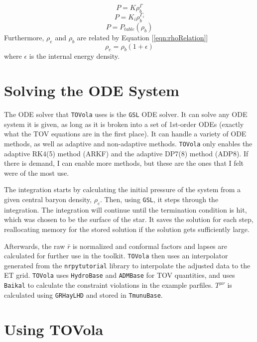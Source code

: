\begin{equation}\label{eqn:EOS:S}
P=K\rho_b^{\Gamma}
\end{equation}
\begin{equation}\label{eqn:EOS:P}
P=K_i\rho_b^{\Gamma_i}
\end{equation}
\begin{equation}\label{eqn:EOS:T}
P=P_{table}(\rho_b)
\end{equation}
Furthermore, $\rho_e$ and $\rho_b$ are related by Equation [\ref{eqn:rhoRelation}]
\begin{equation}\label{eqn:rhoRelation}
\rho_e = \rho_b(1+\epsilon)
\end{equation}
where $\epsilon$ is the internal energy density.

\section{Solving the ODE System}

The ODE solver that {\tt TOVola} uses is the {\tt GSL} ODE solver. It can solve any ODE system it is given, as long as it is broken into a set of 1st-order ODEs (exactly what the TOV equations are in the first place). It can handle a variety of ODE methods, as well as adaptive and non-adaptive methods. {\tt TOVola} only enables the adaptive RK4(5) method (ARKF) and the adaptive DP7(8) method (ADP8). If there is demand, I can enable more methods, but these are the ones that I felt were of the most use.

The integration starts by calculating the initial pressure of the system from a given central baryon density, $\rho_c$. Then, using {\tt GSL}, it steps through the integration. The integration will continue until the termination condition is hit, which was chosen to be the surface of the star. It saves the solution for each step, reallocating memory for the stored solution if the solution gets sufficiently large.

Afterwards, the raw $\bar{r}$ is normalized and conformal factors and lapses are calculated for further use in the toolkit. {\tt TOVola} then uses an interpolator generated from the {\tt nrpytutorial}\cite{NRpy} library to interpolate the adjusted data to the ET grid. {\tt TOVola} uses {\tt HydroBase} and {\tt ADMBase} for TOV quantities, and uses {\tt Baikal} to calculate the constraint violations in the example parfiles. $T^{\mu\nu}$ is calculated using {\tt GRHayLHD} and stored in {\tt TmunuBase}.

\section{Using TOVola}

